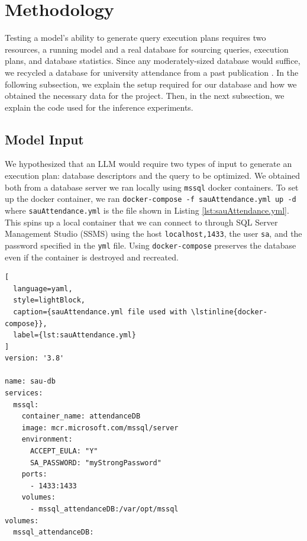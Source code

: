 \section{Methodology}
Testing a model's ability to generate query execution plans requires two resources, a running model and a real database for sourcing queries, execution plans, and database statistics. Since any moderately-sized database would suffice, we recycled a database for university attendance from a past publication \cite{hybl2023}. In the following subsection, we explain the setup required for our database and how we obtained the necessary data for the project. Then, in the next subsection, we explain the code used for the inference experiments.

\subsection{Model Input}
We hypothesized that an LLM would require two types of input to generate an execution plan: database descriptors and the query to be optimized. We obtained both from a database server we ran locally using \lstinline{mssql} docker containers. To set up the docker container, we ran \lstinline{docker-compose -f sauAttendance.yml up -d} where \lstinline{sauAttendance.yml} is the file shown in Listing \ref{lst:sauAttendance.yml}. This spins up a local container that we can connect to through SQL Server Management Studio (SSMS) using the host \lstinline{localhost,1433}, the user \lstinline{sa}, and the password specified in the \lstinline{yml} file. Using \lstinline{docker-compose} preserves the database even if the container is destroyed and recreated.

\begin{lstlisting}[
  language=yaml,
  style=lightBlock,
  caption={sauAttendance.yml file used with \lstinline{docker-compose}},
  label={lst:sauAttendance.yml}
]
version: '3.8'

name: sau-db
services:
  mssql:
    container_name: attendanceDB
    image: mcr.microsoft.com/mssql/server
    environment:
      ACCEPT_EULA: "Y"
      SA_PASSWORD: "myStrongPassword"
    ports:
      - 1433:1433
    volumes:
      - mssql_attendanceDB:/var/opt/mssql
volumes:
  mssql_attendanceDB:
\end{lstlisting}

